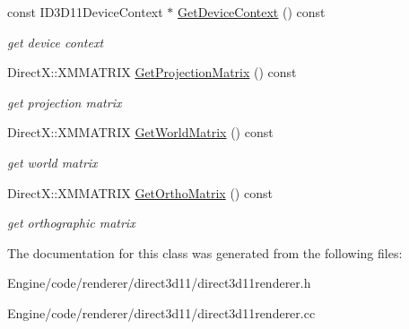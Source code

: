 \begin{DoxyCompactItemize}
\mbox{\label{class_direct3_d11_1_1_direct3_d11_renderer_ae78d23bb17dd6aef3f0c57461bf35aae}} 
const I\+D3\+D11\+Device\+Context $\ast$ \mbox{\hyperlink{class_direct3_d11_1_1_direct3_d11_renderer_ae78d23bb17dd6aef3f0c57461bf35aae}{Get\+Device\+Context}} () const
\begin{DoxyCompactList}\small\item\em get device context \end{DoxyCompactList}\item 
\mbox{\label{class_direct3_d11_1_1_direct3_d11_renderer_a8aeaf83ec282381a4d5520f0bf7bcffc}} 
Direct\+X\+::\+X\+M\+M\+A\+T\+R\+IX \mbox{\hyperlink{class_direct3_d11_1_1_direct3_d11_renderer_a8aeaf83ec282381a4d5520f0bf7bcffc}{Get\+Projection\+Matrix}} () const
\begin{DoxyCompactList}\small\item\em get projection matrix \end{DoxyCompactList}\item 
\mbox{\label{class_direct3_d11_1_1_direct3_d11_renderer_a97115e78c14d1dbe3bbbe3abcb2ae565}} 
Direct\+X\+::\+X\+M\+M\+A\+T\+R\+IX \mbox{\hyperlink{class_direct3_d11_1_1_direct3_d11_renderer_a97115e78c14d1dbe3bbbe3abcb2ae565}{Get\+World\+Matrix}} () const
\begin{DoxyCompactList}\small\item\em get world matrix \end{DoxyCompactList}\item 
\mbox{\label{class_direct3_d11_1_1_direct3_d11_renderer_a82600d1184f6ecd4cafcc60897ee6e91}} 
Direct\+X\+::\+X\+M\+M\+A\+T\+R\+IX \mbox{\hyperlink{class_direct3_d11_1_1_direct3_d11_renderer_a82600d1184f6ecd4cafcc60897ee6e91}{Get\+Ortho\+Matrix}} () const
\begin{DoxyCompactList}\small\item\em get orthographic matrix \end{DoxyCompactList}\end{DoxyCompactItemize}


The documentation for this class was generated from the following files\+:\begin{DoxyCompactItemize}
\item 
Engine/code/renderer/direct3d11/direct3d11renderer.\+h\item 
Engine/code/renderer/direct3d11/direct3d11renderer.\+cc\end{DoxyCompactItemize}
